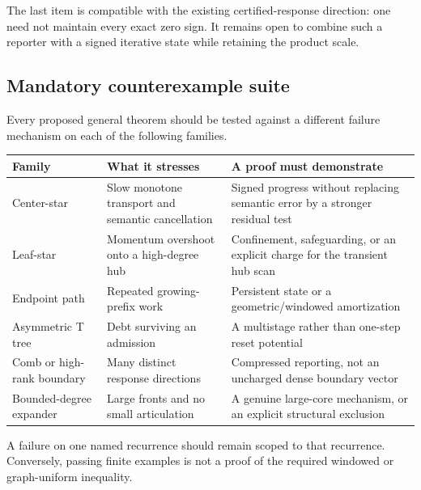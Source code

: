 The last item is compatible with the existing certified-response direction:
one need not maintain every exact zero sign.  It remains open to combine such
a reporter with a signed iterative state while retaining the product scale.

\subsection{Mandatory counterexample suite}

Every proposed general theorem should be tested against a different failure
mechanism on each of the following families.

\begin{center}
\begin{tabular}{p{}p{}p{}}
\toprule
Family & What it stresses & A proof must demonstrate \\
\midrule
Center-star & Slow monotone transport and semantic cancellation & Signed
progress without replacing semantic error by a stronger residual test \\
Leaf-star & Momentum overshoot onto a high-degree hub & Confinement,
safeguarding, or an explicit charge for the transient hub scan \\
Endpoint path & Repeated growing-prefix work & Persistent state or a
geometric/windowed amortization \\
Asymmetric T tree & Debt surviving an admission & A multistage rather than
one-step reset potential \\
Comb or high-rank boundary & Many distinct response directions & Compressed
reporting, not an uncharged dense boundary vector \\
Bounded-degree expander & Large fronts and no small articulation & A genuine
large-core mechanism, or an explicit structural exclusion \\
\bottomrule
\end{tabular}
\end{center}

A failure on one named recurrence should remain scoped to that recurrence.
Conversely, passing finite examples is not a proof of the required windowed
or graph-uniform inequality.
